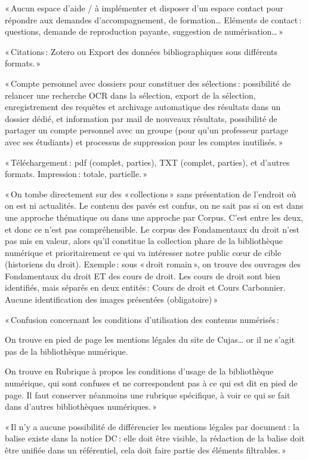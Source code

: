 « Aucun espace d’aide / à implémenter et disposer d’un espace contact pour répondre aux demandes d’accompagnement, de formation… Eléments de contact : questions, demande de reproduction payante, suggestion de numérisation… » 

« Citations : Zotero ou Export des données bibliographiques sous différents formats. »  

« Compte personnel avec dossiers pour constituer des sélections : possibilité de relancer une recherche OCR dans la sélection, export de la sélection, enregistrement des requêtes et archivage automatique des résultats dans un dossier dédié, et information par mail de nouveaux résultats, possibilité de partager un compte personnel avec un groupe (pour qu’un professeur partage avec ses étudiants) et processus de suppression pour les comptes inutilisés. » 

« Téléchargement : pdf (complet, parties), TXT (complet, parties), et d’autres formats. Impression : totale, partielle. »  

« On tombe directement sur des « collections » sans présentation de l’endroit où on est ni actualités. Le contenu des pavés est confus, on ne sait pas si on est dans une approche thématique ou dans une approche par Corpus. C’est entre les deux, et donc ce n’est pas compréhensible. Le corpus des Fondamentaux du droit n’est pas mis en valeur, alors qu’il constitue la collection phare de la bibliothèque numérique et prioritairement ce qui va intéresser notre public cœur de cible (historiens du droit). Exemple : sous « droit romain », on trouve des ouvrages des Fondamentaux du droit ET des cours de droit. Les cours de droit sont bien identifiés, mais séparés en deux entités : Cours de droit et Cours Carbonnier. Aucune identification des images présentées (obligatoire) » 

« Confusion concernant les conditions d’utilisation des contenus numérisés :  

On trouve en pied de page les mentions légales du site de Cujas… or il ne s’agit pas de la bibliothèque numérique.  

On trouve en Rubrique à propos les conditions d’usage de la bibliothèque numérique, qui sont confuses et ne correspondent pas à ce qui est dit en pied de page. Il faut conserver néanmoins une rubrique spécifique, à voir ce qui se fait dans d’autres bibliothèques numériques. » 

« Il n’y a aucune possibilité de différencier les mentions légales par document : la balise existe dans la notice DC : elle doit être visible, la rédaction de la balise doit être unifiée dans un référentiel, cela doit faire partie des éléments filtrables. »  

